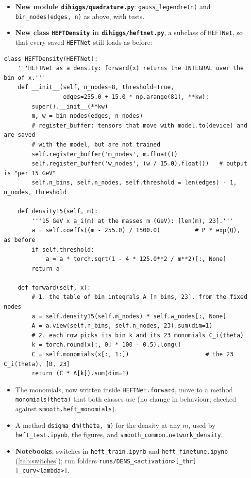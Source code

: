 \documentclass[11pt]{article}
\newcommand{\file}[1]{\nolinkurl{#1}}
\newcommand{\code}[1]{\texttt{#1}}
\begin{document}
\begin{itemize}
  \item \textbf{New module \file{dihiggs/quadrature.py}}: \code{gauss\_legendre(n)} and
    \code{bin\_nodes(edges, n)} as above, with tests.
  \item \textbf{New class \code{HEFTDensity} in \file{dihiggs/heftnet.py}}, a subclass of
    \code{HEFTNet}, so that every saved \code{HEFTNet} still loads as before:
\end{itemize}
\begin{lstlisting}
class HEFTDensity(HEFTNet):
    '''HEFTNet as a density: forward(x) returns the INTEGRAL over the bin of x.'''
    def __init__(self, n_nodes=8, threshold=True,
                 edges=255.0 + 15.0 * np.arange(81), **kw):
        super().__init__(**kw)
        m, w = bin_nodes(edges, n_nodes)
        # register_buffer: tensors that move with model.to(device) and are saved
        # with the model, but are not trained
        self.register_buffer('m_nodes', m.float())
        self.register_buffer('w_nodes', (w / 15.0).float())   # output is "per 15 GeV"
        self.n_bins, self.n_nodes, self.threshold = len(edges) - 1, n_nodes, threshold

    def density15(self, m):
        '''15 GeV x a_i(m) at the masses m (GeV): [len(m), 23].'''
        a = self.coeffs((m - 255.0) / 1500.0)          # P * exp(Q), as before
        if self.threshold:
            a = a * torch.sqrt(1 - 4 * 125.0**2 / m**2)[:, None]
        return a

    def forward(self, x):
        # 1. the table of bin integrals A [n_bins, 23], from the fixed nodes
        a = self.density15(self.m_nodes) * self.w_nodes[:, None]
        A = a.view(self.n_bins, self.n_nodes, 23).sum(dim=1)
        # 2. each row picks its bin k and its 23 monomials C_i(theta)
        k = torch.round(x[:, 0] * 100 - 0.5).long()
        C = self.monomials(x[:, 1:])                      # the 23 C_i(theta), [B, 23]
        return (C * A[k]).sum(dim=1)
\end{lstlisting}
\begin{itemize}
  \item The monomials, now written inside \code{HEFTNet.forward}, move to a method
    \code{monomials(theta)} that both classes use (no change in behaviour; checked against
    \code{smooth.heft\_monomials}).
  \item A method \code{dsigma\_dm(theta, m)} for the density at any $m$, used by
    \file{heft_test.ipynb}, the figures, and \code{smooth\_common.network\_density}.
  \item \textbf{Notebooks}: switches in \file{heft_train.ipynb} and \file{heft_finetune.ipynb}
    (\cref{tab:switches}); run folders \file{runs/DENS_<activation>[_thr][_curv<lambda>]}.
\end{itemize}
\end{document}
